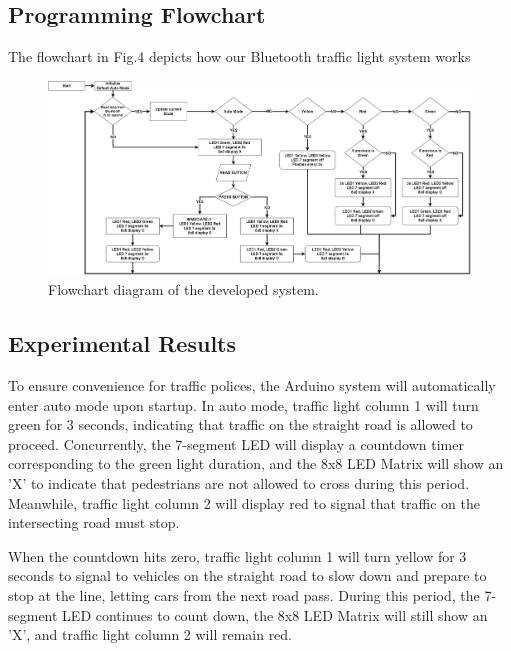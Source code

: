 \documentclass[conference, onecolumn]{IEEEtran}
\begin{document}
\subsection{Programming Flowchart}
The flowchart in Fig.4 depicts how our Bluetooth traffic light system works

\begin{figure}[htbp]
\centerline{\includegraphics[width=7 in]{FlowChart-final_1.drawio.png}}
\caption{Flowchart diagram of the developed system.}
\label{fig}
\end{figure}



\subsection{Experimental Results}
To ensure convenience for traffic polices, the Arduino system will automatically enter auto mode upon startup. In auto mode, traffic light column 1 will turn green for 3 seconds, indicating that traffic on the straight road is allowed to proceed. Concurrently, the 7-segment LED will display a countdown timer corresponding to the green light duration, and the 8x8 LED Matrix will show an 'X' to indicate that pedestrians are not allowed to cross during this period. Meanwhile, traffic light column 2 will display red to signal that traffic on the intersecting road must stop.\par

When the countdown hits zero, traffic light column 1 will turn yellow for 3 seconds to signal to vehicles on the straight road to slow down and prepare to stop at the line, letting cars from the next road pass. During this period, the 7-segment LED continues to count down, the 8x8 LED Matrix will still show an 'X', and traffic light column 2 will remain red.\par
\end{document}
